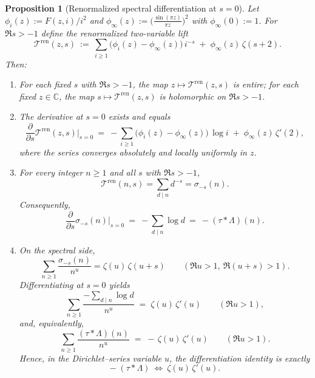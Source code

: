 \documentclass[11pt,a4paper]{amsart}
\newcommand{\C}{\mathbb{C}}
\theoremstyle{plain}
\newtheorem{proposition}[theorem]{Proposition}
\theoremstyle{definition}
\theoremstyle{remark}
\begin{document}
\begin{proposition}[Renormalized spectral differentiation at $s=0$]\label{prop:spectral-diff}
Let $\phi_i(z):=F(z,i)/i^2$ and $\phi_\infty(z):=\bigl(\frac{\sin(\pi z)}{\pi z}\bigr)^2$ with $\phi_\infty(0):=1$.
For $\Re s>-1$ define the renormalized two-variable lift
\[
\mathcal T^{\mathrm{ren}}(z,s)\ :=\ \sum_{i\ge1}\bigl(\phi_i(z)-\phi_\infty(z)\bigr)\,i^{-s}\;+\;\phi_\infty(z)\,\zeta(s+2).
\]
Then:
\begin{enumerate}
\item For each fixed $s$ with $\Re s>-1$, the map $z\mapsto \mathcal T^{\mathrm{ren}}(z,s)$ is entire; for each fixed $z\in\C$, the map $s\mapsto \mathcal T^{\mathrm{ren}}(z,s)$ is holomorphic on $\Re s>-1$.
\item The derivative at $s=0$ exists and equals
\[
\frac{\partial}{\partial s}\mathcal T^{\mathrm{ren}}(z,s)\Big|_{s=0}
\ =\ -\sum_{i\ge1}\bigl(\phi_i(z)-\phi_\infty(z)\bigr)\,\log i\;+\;\phi_\infty(z)\,\zeta'(2),
\]
where the series converges absolutely and locally uniformly in $z$.
\item For every integer $n\ge1$ and all $s$ with $\Re s>-1$,
\[
\mathcal T^{\mathrm{ren}}(n,s)=\sum_{d\mid n}d^{-s}=\sigma_{-s}(n).
\]
Consequently,
\[
\frac{\partial}{\partial s}\sigma_{-s}(n)\Big|_{s=0}\ =\ -\sum_{d\mid n}\log d\ =\ -(\tau*\Lambda)(n).
\]
\item On the spectral side,
\[
\sum_{n\ge1}\frac{\sigma_{-s}(n)}{n^{u}}=\zeta(u)\,\zeta(u+s)\qquad(\Re u>1,\ \Re(u+s)>1).
\]
Differentiating at $s=0$ yields
\[
\sum_{n\ge1}\frac{-\sum_{d\mid n}\log d}{n^u}\;=\;\zeta(u)\,\zeta'(u)\qquad(\Re u>1),
\]
and, equivalently,
\[
\sum_{n\ge1}\frac{(\tau*\Lambda)(n)}{n^u}\;=\;-\,\zeta(u)\,\zeta'(u)\qquad(\Re u>1).
\]
Hence, in the Dirichlet–series variable $u$, the differentiation identity is exactly
\[
-\;(\tau*\Lambda)\ \Longleftrightarrow\ \zeta(u)\,\zeta'(u).
\]
\end{enumerate}
\end{proposition}
\end{document}
